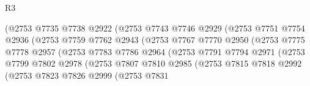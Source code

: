 \begin{lexlean}{R3}
\begin{coremodule}
                                  (@2753
                                    @7735
                                    @7738
                                    @2922
                                    (@2753
                                      @7743
                                      @7746
                                      @2929
                                      (@2753
                                        @7751
                                        @7754
                                        @2936
                                        (@2753
                                          @7759
                                          @7762
                                          @2943
                                          (@2753
                                            @7767
                                            @7770
                                            @2950
                                            (@2753
                                              @7775
                                              @7778
                                              @2957
                                              (@2753
                                                @7783
                                                @7786
                                                @2964
                                                (@2753
                                                  @7791
                                                  @7794
                                                  @2971
                                                  (@2753
                                                    @7799
                                                    @7802
                                                    @2978
                                                    (@2753
                                                      @7807
                                                      @7810
                                                      @2985
                                                      (@2753
                                                        @7815
                                                        @7818
                                                        @2992
                                                        (@2753
                                                          @7823
                                                          @7826
                                                          @2999
                                                          (@2753
                                                            @7831

\end{coremodule}
\end{lexlean}

